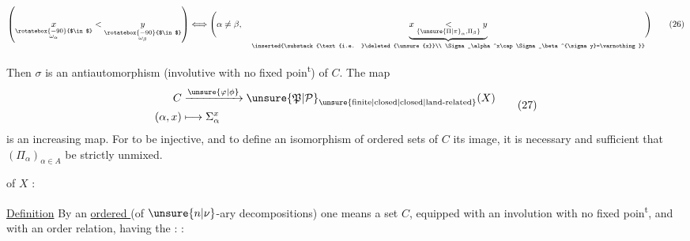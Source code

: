 \begingroup\makeatletter\tagsleft@true\makeatother
\[
\left(
\underset{\substack{\rotatebox{-90}{$\in$}\\\omega_\alpha}}{x}
<
\underset{\substack{\rotatebox{-90}{$\in$}\\\omega_\beta}}{y}
\right)
\Longleftrightarrow
\Biggl(\alpha\ne\beta,\quad
\underbrace{x\underset{\{\unsure{\Pi|\pi}_\alpha,\Pi_\beta\}}{<}y}_{
\inserted{\substack{\text{i.e. }\deleted{\unsure{x}}\\
\Sigma_\alpha^x\cap\Sigma_\beta^{\sigma y}=\varnothing}}}
\Biggr)
\tag*{(26)}
\]

Then $\sigma$ is an antiautomorphism (involutive with no fixed poin\textsuperscript{t}) of $C$. The map
\[
\begin{aligned}
C&\xrightarrow{\unsure{\varphi|\phi}}{\unsure{\mathfrak{P}|\mathcal{P}}}_{\unsure{\text{finite}|\text{closed}|\text{closed}|\text{land-related}}}(X)\\
(\alpha,x)&\longmapsto\Sigma_\alpha^x
\end{aligned}
\tag*{(27)}
\]
is an increasing map. For  to be injective, and to define an isomorphism of ordered sets of $C$  its image, it is necessary and sufficient that $(\Pi_\alpha)_{\alpha\in A}$ be strictly unmixed.

 of $X$ :

\uline{Definition} By an \uline{ordered  } (of $\unsure{n|\nu}$-ary decompositions) one means a   set $C$, equipped with an involution \inserted{$\unsure{\sigma}$} with no fixed poin\textsuperscript{t}, and with an order relation, having the :   :



  

